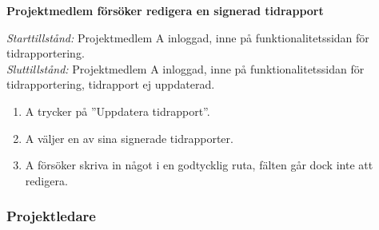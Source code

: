 \documentclass[a4paper]{article}
\begin{document}
\begin{FT}
\item
\textbf{Projektmedlem försöker redigera en signerad tidrapport}

\emph{Starttillstånd:} Projektmedlem A inloggad, inne på funktionalitetssidan för tidrapportering.\\
\emph{Sluttillstånd:} Projektmedlem A inloggad, inne på funktionalitetssidan för tidrapportering, tidrapport ej uppdaterad.

\begin{enumerate}
\item A trycker på ''Uppdatera tidrapport''.
\item A väljer en av sina signerade tidrapporter.
\item A försöker skriva in något i en godtycklig ruta, fälten går dock inte att redigera.
\end{enumerate}

\end{FT}

\subsubsection{Projektledare}
\end{document}
